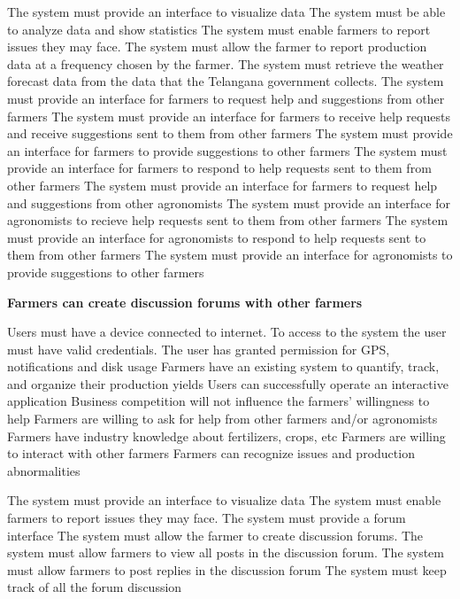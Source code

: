 \begin{itemize}
\begin{itemize}
 The system must provide an interface to visualize data
 The system must be able to analyze data and show statistics
 The system must enable farmers to report issues they may face.
 The system must allow the farmer to report production data at a frequency chosen by the farmer.
 The system must retrieve the weather forecast data from the data that the Telangana government collects.
 The system must provide an interface for farmers to request help and suggestions from other farmers
 The system must provide an interface for farmers to receive help requests and receive suggestions sent to them from other farmers
 The system must provide an interface for farmers to provide suggestions to other farmers
 The system must provide an interface for farmers to respond to help requests sent to them from other farmers
 The system must provide an interface for farmers to request help and suggestions from other agronomists
 The system must provide an interface for agronomists to recieve help requests sent to them from other farmers
 The system must provide an interface for agronomists to respond to help requests sent to them from other farmers 
 The system must provide an interface for agronomists to provide suggestions to other farmers
\end{itemize}

 \textbf{Farmers can create discussion forums with other farmers}
\begin{itemize}
  Users must have a device connected to internet.
 To access to the system the user must have valid credentials.
 The user has granted permission for GPS, notifications and disk usage
 Farmers have an existing system to quantify, track, and organize their production yields
 Users can successfully operate an interactive application
 Business competition will not influence the farmers' willingness to help
 Farmers are willing to ask for help from other farmers and/or agronomists
 Farmers have industry knowledge about fertilizers, crops, etc 
 Farmers are willing to interact with other farmers 
 Farmers can recognize issues and production abnormalities


 The system must provide an interface to visualize data
 The system must enable farmers to report issues they may face.
  The system must provide a forum interface
  The system must allow the farmer to create discussion forums.
  The system must allow farmers to view all posts in the discussion forum.
  The system must allow farmers to post replies in the discussion forum
  The system must keep track of all the forum discussion
\end{itemize}


\end{itemize}

